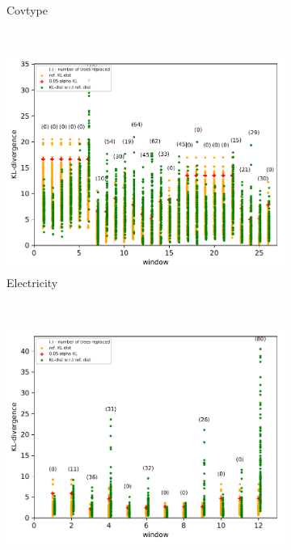 \documentclass{article} %
\begin{document}
\begin{figure}
\begin{subfigure}[b]{0.23\textwidth}
    	\caption{Covtype}
    	\label{fig:concept_drift_covtype}
    \end{subfigure} \\
    \begin{subfigure}[b]{0.23\textwidth}
      \includegraphics[width=\textwidth]{figures/test_concept_drift_electricity}
      \caption{Electricity}
      \label{fig:concept_drift_electricity}
    \end{subfigure}
    ~ %
    \begin{subfigure}[b]{0.23\textwidth}
      \includegraphics[width=\textwidth]{figures/test_concept_drift_weather}

\end{subfigure}
\end{figure}
\end{document}
